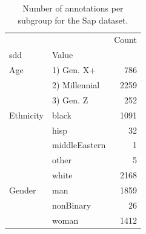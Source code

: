 \begin{table}[t]
\centering
\caption{Number of annotations per subgroup for the Sap dataset.}
\label{tab:subgroups-sap-et-al-2022}
\begin{tabular}{llr}
\toprule
 &  & Count \\
\ac{sdd} & Value &  \\
\midrule
Age & 1) Gen. X+ & 786 \\
 & 2) Millennial & 2259 \\
 & 3) Gen. Z & 252 \\
Ethnicity & black & 1091 \\
 & hisp & 32 \\
 & middleEastern & 1 \\
 & other & 5 \\
 & white & 2168 \\
Gender & man & 1859 \\
 & nonBinary & 26 \\
 & woman & 1412 \\
\bottomrule
\end{tabular}
\end{table}
